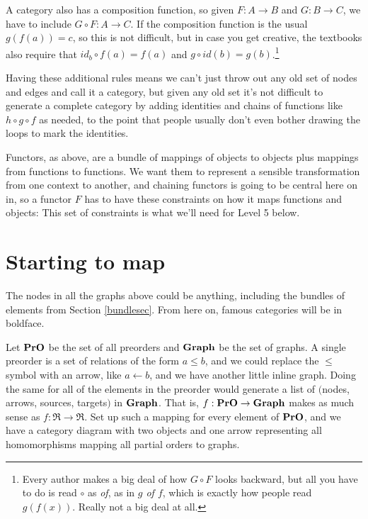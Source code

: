 \documentclass[11pt]{article}
\begin{document}
A category also has a composition function, so given $F:A\to B$
and $G:B\to C$, we have to include $G\circ F:A\to C$. If the composition function
is the usual $g(f(a)) = c$, so this is not difficult, but in case you get
creative, the textbooks also require that $id_b\circ f(a)=f(a)$ and $g\circ id(b)
= g(b)$.\footnote{Every author makes a big deal of how $G\circ F$ looks backward,
but all you have to do is read $\circ$ as {\em of}, as in {\em $g$ of $f$}, which is
exactly how people read $g(f(x))$. Really not a big deal at all.}

Having these additional rules means we can't just throw out any old set of nodes and edges
and call it a category, but given any old set it's not difficult to generate a complete
category by adding identities and chains of functions like $h\circ g\circ f$ as needed,
to the point that people usually don't even bother drawing the loops to mark the
identities.

Functors, as above, are a bundle of mappings of objects to objects plus mappings from
functions to functions. We want them to represent a sensible transformation from one
context to another, and chaining functors is going to be central here on in, so a
functor $F$ has to have these constraints on how it maps functions and objects:
This set of constraints is what we'll need for Level 5 below.

\section{Starting to map}
The nodes in all the graphs above could be anything, including the bundles of elements from
Section \ref{bundlesec}. From here on, famous categories will be in boldface.

Let ${\bf PrO}$ be the set of all preorders and ${\bf Graph}$ be the set of graphs. A
single preorder is a set of relations of the form $a \leq b$, and we could replace the $\leq$
symbol with an arrow, like $a\leftarrow b$, and we have another little inline graph. 
Doing the same for all of the elements in the preorder would generate a list of
$($nodes, arrows, sources, targets$)$ in ${\bf Graph}$.
That is, $f:{\bf PrO}\to {\bf Graph}$ makes as much sense as $f:\Re \to \Re$. Set up such
a mapping for every element of ${\bf PrO}$, and we have a category diagram with two
objects and one arrow representing all homomorphisms mapping all partial orders to graphs.
\end{document}
